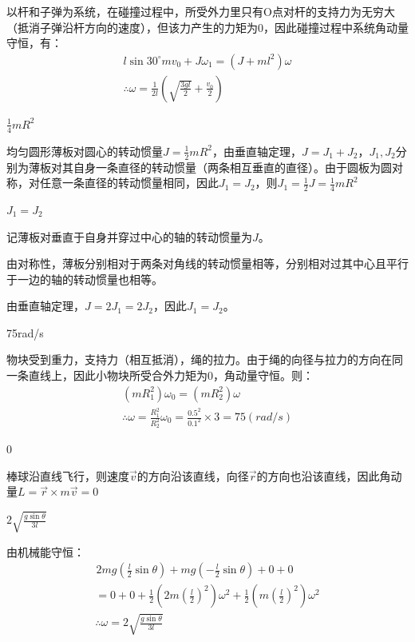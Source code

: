 \documentclass[b5paper,opensource]{qyxf-book}
\begin{document}
以杆和子弹为系统，在碰撞过程中，所受外力里只有O点对杆的支持力为无穷大（抵消子弹沿杆方向的速度），但该力产生的力矩为0，因此碰撞过程中系统角动量守恒，有：
\begin{gather*}
l\sin 30^\circ mv_0+J\omega_1=(J+ml^2)\omega\\
\therefore \omega=\frac{1}{2l}\left(\sqrt{\frac{3gl}{2}}+\frac{v_0}{2}\right)
\end{gather*}

$\frac{1}{4}mR^2$

均匀圆形薄板对圆心的转动惯量$ J=\frac{1}{2}mR^2 $，由垂直轴定理，$ J=J_1+J_2 $，$ J_1,J_2 $分别为薄板对其自身一条直径的转动惯量（两条相互垂直的直径）。由于圆板为圆对称，对任意一条直径的转动惯量相同，因此$ J_1=J_2 $，则$ J_1=\frac{1}{2}J=\frac{1}{4}mR^2 $

$J_1=J_2$

记薄板对垂直于自身并穿过中心的轴的转动惯量为$ J $。

由对称性，薄板分别相对于两条对角线的转动惯量相等，分别相对过其中心且平行于一边的轴的转动惯量也相等。


由垂直轴定理，$ J=2J_1=2J_2 $，因此$ J_1=J_2 $。

75rad/s

物块受到重力，支持力（相互抵消），绳的拉力。由于绳的向径与拉力的方向在同一条直线上，因此小物块所受合外力矩为0，角动量守恒。则：
\begin{gather*}
(mR_1^2)\omega_0=(mR_2^2)\omega\\
\therefore \omega=\frac{R_1^2}{R_2^2}\omega_0=\frac{0.5^2}{0.1^2}\times 3=75(rad/s)
\end{gather*}

0

棒球沿直线飞行，则速度$ \vec{v} $的方向沿该直线，向径$ \vec{r} $的方向也沿该直线，因此角动量$ L=\vec{r}\times m\vec{v}=0 $

$2\sqrt{\frac{g\sin\theta}{3l}}$

由机械能守恒：
\begin{gather*}
\hspace{1pt}2mg\left(\frac{l}{2}\sin\theta\right)+mg\left(-\frac{l}{2}\sin\theta\right)+0+0\\
=0+0+\frac{1}{2}\left(2m\left(\frac{l}{2}\right)^2\right)\omega^2+\frac{1}{2}\left(m\left(\frac{l}{2}\right)^2\right)\omega^2\\
\therefore \omega=2\sqrt{\frac{g\sin\theta}{3l}}
\end{gather*}
\end{document}
